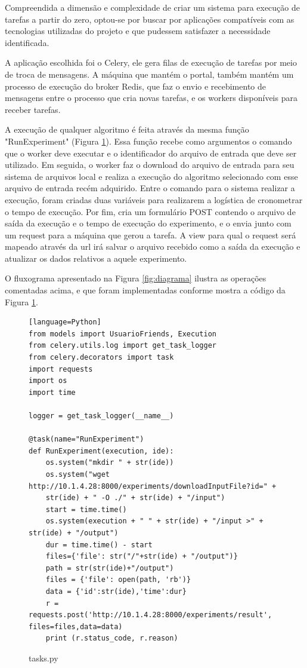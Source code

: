 \documentclass[tg]{mdtufsm}
\begin{document}
Compreendida a dimensão e complexidade de criar um sistema para execução de tarefas a partir do zero, optou-se por buscar por aplicações compatíveis com as tecnologias utilizadas do projeto e que pudessem satisfazer a necessidade identificada.

A aplicação escolhida foi o Celery, ele gera filas de execução de tarefas por meio de troca de mensagens. A máquina que mantém o portal, também mantém um processo de execução do broker Redis, que faz o envio e recebimento de mensagens entre o processo que cria novas tarefas, e os workers disponíveis para receber tarefas.

A execução de qualquer algoritmo é feita através da mesma função "RunExperiment" (Figura \ref{fig:run}). Essa função recebe como argumentos o comando que o worker deve executar e o identificador do arquivo de entrada que deve ser utilizado. Em seguida, o worker faz o download do arquivo de entrada para seu sistema de arquivos local e realiza a execução do algoritmo selecionado com esse arquivo de entrada recém adquirido. Entre o comando para o sistema realizar a execução, foram criadas duas variáveis para realizarem a logística de cronometrar o tempo de execução. Por fim, cria um formulário POST contendo o arquivo de saída da execução e o tempo de execução do experimento, e o envia junto com um request para a máquina que gerou a tarefa. A view para qual o request será mapeado através da url irá salvar o arquivo recebido como a saída da execução e atualizar os dados relativos a aquele experimento.

O fluxograma apresentado na Figura \ref{fig:diagrama} ilustra as operações comentadas acima, e que foram implementadas conforme mostra a código da Figura \ref{fig:run}.

\begin{figure}
	\centering
	\begin{minipage}[c]{1\textwidth}
		\begin{lstlisting}[frame=single][language=Python]
from models import UsuarioFriends, Execution
from celery.utils.log import get_task_logger
from celery.decorators import task
import requests
import os
import time

logger = get_task_logger(__name__)

@task(name="RunExperiment")
def RunExperiment(execution, ide):
	os.system("mkdir " + str(ide))
	os.system("wget http://10.1.4.28:8000/experiments/downloadInputFile?id=" +
	str(ide) + " -O ./" + str(ide) + "/input")
	start = time.time()
	os.system(execution + " " + str(ide) + "/input >" + str(ide) + "/output")
	dur = time.time() - start
	files={'file': str("/"+str(ide) + "/output")}
	path = str(str(ide)+"/output")
	files = {'file': open(path, 'rb')}
	data = {'id':str(ide),'time':dur}
	r = requests.post('http://10.1.4.28:8000/experiments/result', files=files,data=data)
	print (r.status_code, r.reason)
		\end{lstlisting}
		\caption{
			tasks.py
		}
		\label{fig:run}
	\end{minipage}
\end{figure}
\end{document}
